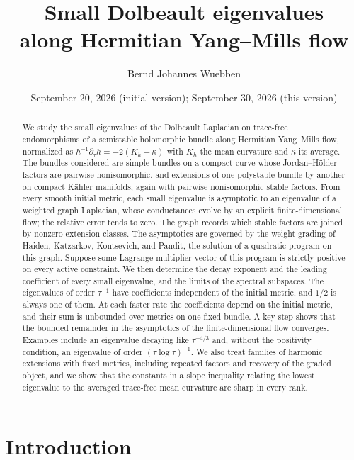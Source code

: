 \documentclass[11pt]{amsart}
\title[Small eigenvalues along Hermitian Yang--Mills flow]{Small Dolbeault eigenvalues\\
along Hermitian Yang--Mills flow}
\author{Bernd Johannes Wuebben}
\date{September 20, 2026 (initial version); September 30, 2026 (this version)}
\theoremstyle{definition}
\theoremstyle{remark}
\begin{document}
\begin{abstract}
We study the small eigenvalues of the Dolbeault Laplacian on trace-free
endomorphisms of a semistable holomorphic bundle along Hermitian
Yang--Mills flow, normalized as $h^{-1}\partial_\tau h=-2(K_h-\kappa)$ with
$K_h$ the mean curvature and $\kappa$ its average. The
bundles considered are simple bundles on a compact curve whose
Jordan--H\"older factors are pairwise nonisomorphic, and extensions of one
polystable bundle by another on compact K\"ahler manifolds, again with
pairwise nonisomorphic stable factors. From every
smooth initial metric, each small eigenvalue is asymptotic to an eigenvalue
of a weighted graph Laplacian, whose conductances evolve by an explicit
finite-dimensional flow; the relative error tends to zero. The graph records
which stable factors are joined by nonzero extension classes. The
asymptotics are governed by the weight grading of Haiden, Katzarkov,
Kontsevich, and Pandit, the solution of a quadratic program on this graph.
Suppose some Lagrange multiplier vector of this program is strictly positive
on every active constraint. We then determine the decay exponent and the
leading coefficient of every small eigenvalue, and the limits of the
spectral subspaces. The eigenvalues of order $\tau^{-1}$ have coefficients
independent of the initial metric, and $1/2$ is always one of them. At each
faster rate the coefficients depend on the initial metric, and their sum is
unbounded over metrics on one fixed bundle. A key step shows that the
bounded remainder in the asymptotics of the finite-dimensional flow
converges. Examples include an eigenvalue decaying like $\tau^{-4/3}$ and,
without the positivity condition, an eigenvalue of order
$(\tau\log\tau)^{-1}$. We also treat families of harmonic extensions with
fixed metrics, including repeated factors
and recovery of the graded object, and we show that the constants in a slope
inequality relating the lowest eigenvalue to the averaged trace-free mean
curvature are sharp in every rank.
\end{abstract}

\maketitle

\section{Introduction}\label{sec:intro}
\end{document}
